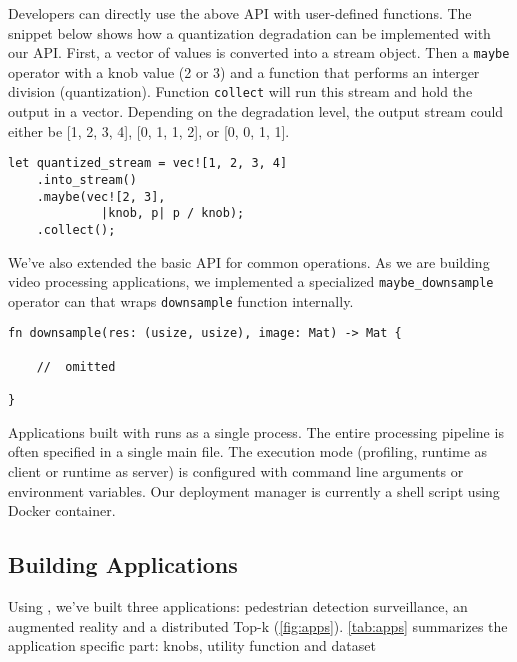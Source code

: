 Developers can directly use the above API with user-defined functions. The
snippet below shows how a quantization degradation can be implemented with our
API. First, a vector of values is converted into a stream object. Then a
\texttt{maybe} operator with a knob value (2 or 3) and a function that performs
an interger division (quantization). Function \texttt{collect} will run this
stream and hold the output in a vector. Depending on the degradation level, the
output stream could either be [1, 2, 3, 4], [0, 1, 1, 2], or [0, 0, 1, 1].

\begin{lstlisting}
let quantized_stream = vec![1, 2, 3, 4]
    .into_stream()
    .maybe(vec![2, 3],
             |knob, p| p / knob);
    .collect();
\end{lstlisting}

We've also extended the basic API for common operations. As we are building
video processing applications, we implemented a specialized
\texttt{maybe\_downsample} operator can that wraps \texttt{downsample} function
internally.

\begin{lstlisting}
fn downsample(res: (usize, usize), image: Mat) -> Mat {

    //  omitted

}
\end{lstlisting}

Applications built with \sysname{} runs as a single process. The entire
processing pipeline is often specified in a single main file. The execution mode
(profiling, runtime as client or runtime as server) is configured with command
line arguments or environment variables. Our deployment manager is currently a
shell script using Docker container.

\subsection{Building \sysname{} Applications}
\label{sec:build-appl}

Using \sysname{}, we've built three applications: pedestrian detection
surveillance, an augmented reality and a distributed Top-k (\autoref{fig:apps}).
\autoref{tab:apps} summarizes the application specific part: knobs, utility
function and dataset

